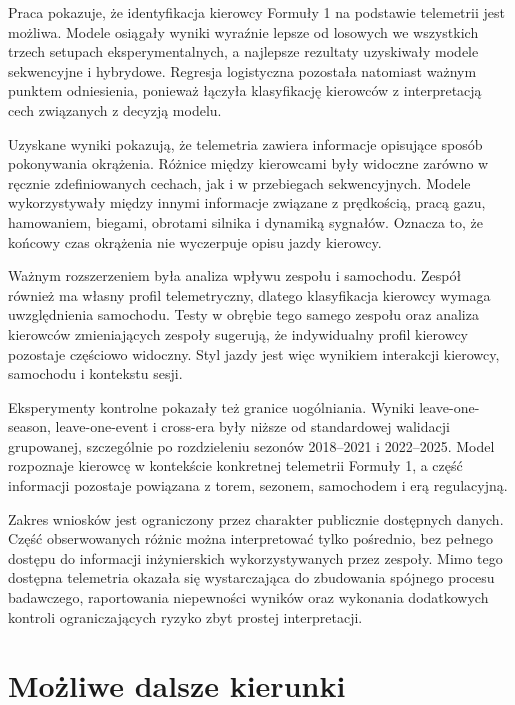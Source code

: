 \documentclass[printmode,pl]{mgr}
\begin{document}
Praca pokazuje, że identyfikacja kierowcy Formuły 1 na podstawie telemetrii jest możliwa. Modele osiągały wyniki wyraźnie lepsze od losowych we wszystkich trzech setupach eksperymentalnych, a najlepsze rezultaty uzyskiwały modele sekwencyjne i hybrydowe. Regresja logistyczna pozostała natomiast ważnym punktem odniesienia, ponieważ łączyła klasyfikację kierowców z interpretacją cech związanych z decyzją modelu.

Uzyskane wyniki pokazują, że telemetria zawiera informacje opisujące sposób pokonywania okrążenia. Różnice między kierowcami były widoczne zarówno w ręcznie zdefiniowanych cechach, jak i w przebiegach sekwencyjnych. Modele wykorzystywały między innymi informacje związane z prędkością, pracą gazu, hamowaniem, biegami, obrotami silnika i dynamiką sygnałów. Oznacza to, że końcowy czas okrążenia nie wyczerpuje opisu jazdy kierowcy.

Ważnym rozszerzeniem była analiza wpływu zespołu i samochodu. Zespół również ma własny profil telemetryczny, dlatego klasyfikacja kierowcy wymaga uwzględnienia samochodu. Testy w obrębie tego samego zespołu oraz analiza kierowców zmieniających zespoły sugerują, że indywidualny profil kierowcy pozostaje częściowo widoczny. Styl jazdy jest więc wynikiem interakcji kierowcy, samochodu i kontekstu sesji.

Eksperymenty kontrolne pokazały też granice uogólniania. Wyniki leave-one-season, leave-one-event i cross-era były niższe od standardowej walidacji grupowanej, szczególnie po rozdzieleniu sezonów 2018--2021 i 2022--2025. Model rozpoznaje kierowcę w kontekście konkretnej telemetrii Formuły 1, a część informacji pozostaje powiązana z torem, sezonem, samochodem i erą regulacyjną.

Zakres wniosków jest ograniczony przez charakter publicznie dostępnych danych. Część obserwowanych różnic można interpretować tylko pośrednio, bez pełnego dostępu do informacji inżynierskich wykorzystywanych przez zespoły. Mimo tego dostępna telemetria okazała się wystarczająca do zbudowania spójnego procesu badawczego, raportowania niepewności wyników oraz wykonania dodatkowych kontroli ograniczających ryzyko zbyt prostej interpretacji.

\section{Możliwe dalsze kierunki}
\end{document}
